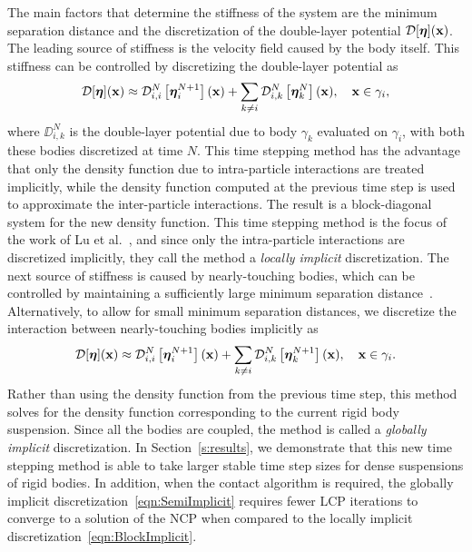 \documentclass[AMA,STIX1COL]{WileyNJD-v2}
\begin{document}
The main factors that determine the stiffness of the system are the
minimum separation distance and the discretization of the double-layer
potential ${\mathcal{D}}[{\boldsymbol\eta}]({\mathbf{x}})$.  The leading source of stiffness is the
velocity field caused by the body itself. This stiffness can be
controlled by discretizing the double-layer potential as
\begin{align}
  {\mathcal{D}}[{\boldsymbol\eta}]({\mathbf{x}}) \approx {\mathcal{D}}^{N}_{i,i}\left[{\boldsymbol\eta}_i^{N+1}\right]({\mathbf{x}}) + 
    \sum_{k \neq i} {\mathcal{D}}^{N}_{i,k}\left[{\boldsymbol\eta}_k^{N}\right]({\mathbf{x}}),
    \quad {\mathbf{x}} \in \gamma_i,
  \label{eqn:BlockImplicit}
\end{align}
where $\DD_{i,k}^N$ is the double-layer potential due to body $\gamma_k$
evaluated on $\gamma_i$, with both these bodies discretized at time $N$.
This time stepping method has the advantage that only the density
function due to intra-particle interactions are treated implicitly,
while the density function computed at the previous time step is used to
approximate the inter-particle interactions.  The result is a
block-diagonal system for the new density function.  This time stepping
method is the focus of the work of Lu et al.~\cite{Lu2017}, and since
only the intra-particle interactions are discretized implicitly, they
call the method a {\em locally implicit} discretization.  The next
source of stiffness is caused by nearly-touching bodies, which can be
controlled by maintaining a sufficiently large minimum separation
distance~\cite{Lu2017}.  Alternatively, to allow for small minimum
separation distances, we discretize the interaction between
nearly-touching bodies implicitly as
\begin{align}
  {\mathcal{D}}[{\boldsymbol\eta}]({\mathbf{x}}) \approx {\mathcal{D}}^{N}_{i,i}\left[{\boldsymbol\eta}_i^{N+1}\right]({\mathbf{x}}) + 
    \sum_{k \neq i} {\mathcal{D}}^{N}_{i,k}\left[{\boldsymbol\eta}_k^{N+1}\right]({\mathbf{x}}),
    \quad {\mathbf{x}} \in \gamma_i.
  \label{eqn:SemiImplicit}
\end{align}
Rather than using the density function from the previous time step, this
method solves for the density function corresponding to the current
rigid body suspension.  Since all the bodies are coupled, the method is
called a {\em globally implicit} discretization.  In
Section~\ref{s:results}, we demonstrate that this new time stepping
method is able to take larger stable time step sizes for dense
suspensions of rigid bodies.  In addition, when the contact algorithm is
required, the globally implicit discretization~\eqref{eqn:SemiImplicit}
requires fewer LCP iterations to converge to a solution of the NCP when
compared to the locally implicit
discretization~\eqref{eqn:BlockImplicit}.
\end{document}
